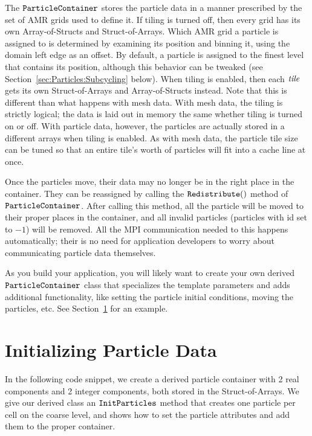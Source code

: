 The $\tt{ParticleContainer}$ stores the particle data in a manner prescribed by the set of AMR grids used to define it. If tiling is turned off, then every grid has its own 
Array-of-Structs and Struct-of-Arrays. Which AMR grid a particle is assigned to is determined by examining its position and binning it, using the domain left edge as an offset. 
By default, a particle is assigned to the finest level that contains its position, although this behavior can be tweaked (see Section~\ref{sec:Particles:Subcycling} below). 
When tiling is enabled, then each $\emph{tile}$ gets its own Struct-of-Arrays and Array-of-Structs instead. Note that this is different than what happens with mesh data. With mesh
data, the tiling is strictly logical; the data is laid out in memory the same whether tiling is turned on or off. With particle data, however, the particles are actually stored in 
a different arrays when tiling is enabled. As with mesh data, the particle tile size can be tuned so that an entire tile's worth of particles will fit into a cache line at once.

Once the particles move, their data may no longer be in the right place in the container. They can be reassigned by calling the $\tt{Redistribute()}$ method of $\tt{ParticleContainer}$.
After calling this method, all the particle will be moved to their proper places in the container, and all invalid particles (particles with id set to $-1$) will be removed. All the 
MPI communication needed to this happens automatically; their is no need for application developers to worry about communicating particle data themselves.

As you build your application, you will likely want to create your own derived $\tt{ParticleContainer}$ class that specializes the template parameters and adds additional 
functionality, like setting the particle initial conditions, moving the particles, etc. See Section~\ref{sec:Particles:Initializing} for an example.

\section{Initializing Particle Data}
\label{sec:Particles:Initializing}

In the following code snippet, we create a derived particle container with 2 real components and 2 integer components, both stored in the Struct-of-Arrays.
We give our derived class an $\tt{InitParticles}$ method that creates one particle per cell on the coarse level, and shows how to set the particle attributes
and add them to the proper container. 

